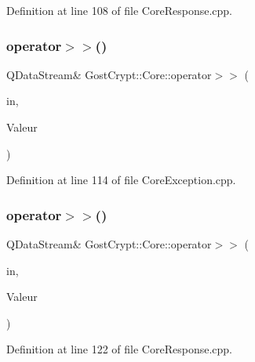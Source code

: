 Definition at line 108 of file Core\+Response.\+cpp.

\mbox{\label{namespace_gost_crypt_1_1_core_abd500d2ef4921956c90431870261c90f}} 
\subsubsection{\texorpdfstring{operator$>$$>$()}{operator>>()}\hspace{0.1cm}{\footnotesize\ttfamily [17/56]}}
{\footnotesize\ttfamily Q\+Data\+Stream\& Gost\+Crypt\+::\+Core\+::operator$>$$>$ (\begin{DoxyParamCaption}\item[{Q\+Data\+Stream \&}]{in,  }\item[{\hyperlink{class_gost_crypt_1_1_core_1_1_mount_point_used}{Gost\+Crypt\+::\+Core\+::\+Mount\+Point\+Used} \&}]{Valeur }\end{DoxyParamCaption})}



Definition at line 114 of file Core\+Exception.\+cpp.

\mbox{\label{namespace_gost_crypt_1_1_core_a6803c8e33f7fb6fcfc6e720953f0539e}} 
\subsubsection{\texorpdfstring{operator$>$$>$()}{operator>>()}\hspace{0.1cm}{\footnotesize\ttfamily [18/56]}}
{\footnotesize\ttfamily Q\+Data\+Stream\& Gost\+Crypt\+::\+Core\+::operator$>$$>$ (\begin{DoxyParamCaption}\item[{Q\+Data\+Stream \&}]{in,  }\item[{\hyperlink{struct_gost_crypt_1_1_core_1_1_dismount_volume_response}{Dismount\+Volume\+Response} \&}]{Valeur }\end{DoxyParamCaption})}



Definition at line 122 of file Core\+Response.\+cpp.

